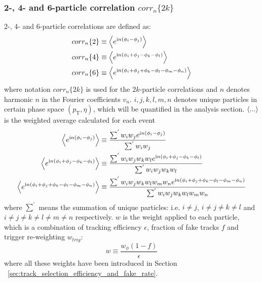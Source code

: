 \subsubsection{2-, 4- and 6-particle correlation $corr_n\{2k\}$}
2-, 4- and 6-particle correlations are defined as:
\begin{equation}
\begin{split}
corr_n\{2\}&\equiv \left\langle e^{\text{i}n(\phi_i-\phi_j)}\right\rangle \\
corr_n\{4\}&\equiv \left\langle e^{\text{i}n(\phi_i+\phi_j-\phi_k-\phi_l)}\right\rangle \\
corr_n\{6\}&\equiv \left\langle e^{\text{i}n(\phi_i+\phi_j+\phi_k-\phi_l-\phi_m-\phi_n)}\right\rangle
\end{split}
\end{equation}
where notation $corr_n\{2k\}$ is used for the $2k$-particle correlations and $n$ denotes harmonic $n$ in the Fourier coefficients $v_n$. $i, j, k, l, m, n$ denotes unique particles in certain phase space $(p_\text{T},\eta)$, which will be quantified in the analysis section. $\left\langle ...\right\rangle$ is the weighted average calculated for each event
\begin{equation}
\begin{split}
\left\langle e^{\text{i}n(\phi_i-\phi_j)}\right\rangle&\equiv \frac{\sum^{'}{w_i w_j e^{\text{i}n(\phi_i-\phi_j)}}}{\sum^{'}{w_i w_j}} \\
\left\langle e^{\text{i}n(\phi_i+\phi_j-\phi_k-\phi_l)}\right\rangle&\equiv \frac{\sum^{'}{w_i w_j w_k w_l e^{\text{i}n(\phi_i+\phi_j-\phi_k-\phi_l)}}}{\sum^{'}{w_i w_j w_k w_l}} \\
\left\langle e^{\text{i}n(\phi_i+\phi_j+\phi_k-\phi_l-\phi_m-\phi_n)}\right\rangle&\equiv \frac{\sum^{'}{w_i w_j w_k w_l w_m w_n e^{\text{i}n(\phi_i+\phi_j+\phi_k-\phi_l-\phi_m-\phi_n)}}}{\sum^{'}{w_i w_j w_k w_l w_m w_n}}
\end{split}
\end{equation}
where $\sum^{'}$ means the summation of unique particles: i.e. $i\neq j$, $i\neq j\neq k\neq l$ and $i\neq j\neq k\neq l\neq m\neq n$ respectively. $w$ is the weight applied to each particle, which is a combination of tracking efficiency $\epsilon$, fraction of fake tracks $f$ and trigger re-weighting $w_{trig}$:
\begin{equation}
w\equiv\frac{w_{\phi}(1-f)}{\epsilon}
\end{equation}
where all these weights have been introduced in Section ~\ref{sec:track_selection_efficiency_and_fake_rate}.

